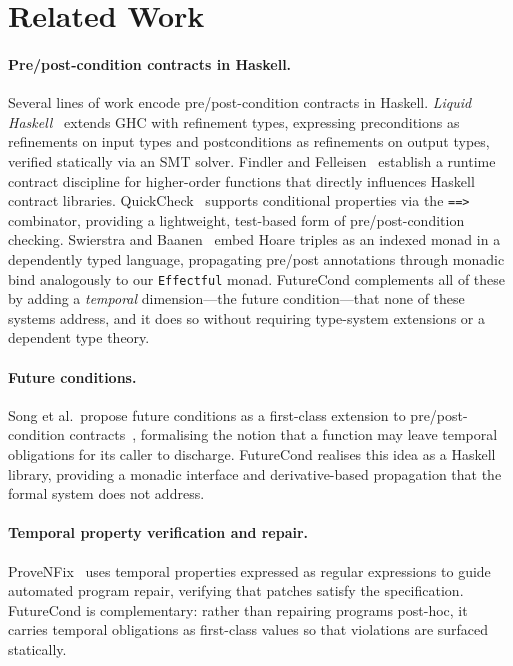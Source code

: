 \documentclass[acmsmall,screen]{acmart}
\begin{document}
\section{Related Work}

\label{sec:related}

\paragraph{Pre/post-condition contracts in Haskell.}
Several lines of work encode pre/post-condition contracts in Haskell.
\emph{Liquid Haskell}~\cite{vazou2014} extends GHC with refinement types,
expressing preconditions as refinements on input types and postconditions as
refinements on output types, verified statically via an SMT solver.
Findler and Felleisen~\cite{findler2002} establish a runtime contract
discipline for higher-order functions that directly influences Haskell
contract libraries.
QuickCheck~\cite{claessen2000} supports conditional properties via the
\lstinline{==>} combinator, providing a lightweight, test-based form of
pre/post-condition checking.
Swierstra and Baanen~\cite{swierstra2019} embed Hoare triples as an indexed
monad in a dependently typed language, propagating pre/post annotations through
monadic bind analogously to our \lstinline{Effectful} monad.
FutureCond complements all of these by adding a \emph{temporal}
dimension---the future condition---that none of these systems address,
and it does so without requiring type-system extensions or a dependent type
theory.

\paragraph{Future conditions.}
Song et al.\ propose future conditions as a first-class extension to
pre/post-condition contracts~\cite{song2025futurecond}, formalising the
notion that a function may leave temporal obligations for its caller to
discharge. FutureCond realises this idea as a Haskell library, providing
a monadic interface and derivative-based propagation that the formal
system does not address.

\paragraph{Temporal property verification and repair.}
ProveNFix~\cite{song2024provenfix} uses temporal properties expressed as
regular expressions to guide automated program repair, verifying that
patches satisfy the specification. FutureCond is complementary: rather
than repairing programs post-hoc, it carries temporal obligations as
first-class values so that violations are surfaced statically.
\end{document}
